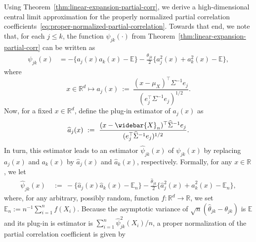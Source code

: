 \documentclass{article}
\begin{document}
 
 Using Theorem~\ref{thm:linear-expansion-partial-corr}, we derive a high-dimensional central limit approximation  for the properly normalized partial correlation coefficients~\eqref{eq:proper-normalized-partial-correlation}. Towards that end, we note that, for each $j \leq k$, the function  $\psi_{jk}(\cdot)$ from Theorem~\ref{thm:linear-expansion-partial-corr} can be written as
 \begin{equation}\label{eq:def-psi-jk}
 \begin{split}
 \psi_{jk}(x) &= -\bigg\{a_j(x)a_k(x) - \mathbb{E}\bigg\}
 
 
 - \frac{\theta_{jk}}{2}\bigg\{a_j^2(x) + a_k^2(x) - \mathbb{E}\bigg\},
 \end{split}
 \end{equation}
 where
 \begin{equation}\label{eq:ajx-function}
 x \in \mathbb{R}^d \mapsto a_j(x) ~:=~ \frac{(x - \mu_X)^{\top}\Sigma^{-1}e_j}{(e_j^{\top}\Sigma^{-1}e_j)^{1/2}}.
 \end{equation}
 Now, for a fixed $x \in \mathbb{R}^d$, define the plug-in estimator of $a_j(x)$ as
 \begin{equation}\label{eq:ajhatx-function}
 \widehat{a}_j(x) ~:=~ \frac{(x - \widebar{X}_n)^{\top}\widehat{\Sigma}^{-1}e_j}{(e_j^{\top}\widehat{\Sigma}^{-1}e_j)^{1/2}}.
 \end{equation}
 In turn, this estimator leads to an estimator $\widehat{\psi}_{jk}(x)$ of $\psi_{jk}(x)$ by replacing $a_j(x)$ and $a_k(x)$ by $\widehat{a}_j(x)$ and $\widehat{a}_k(x)$, respectively.  Formally, for any $x \in \mathbb{R}$, we let
 \begin{equation}\label{eq:def-widehat-psi-jk}
 \begin{split}
 \widehat{\psi}_{jk}(x) ~&:=~ -\bigg\{\widehat{a}_j(x)\widehat{a}_k(x) - \mathbb{E}_n\bigg\}
 
 
 - \frac{\widehat{\theta}_{jk}}{2}\bigg\{\widehat{a}_j^2(x) + \widehat{a}_k^2(x) - \mathbb{E}_n\bigg\},
 \end{split}
 \end{equation}
 where, for any arbitrary, possibly random, function $f \colon \mathbb{R}^d \rightarrow \mathbb{R}$,  we set $\mathbb{E}_n := n^{-1}\sum_{i=1}^n f(X_i)$. Because the asymptotic variance of $\sqrt{n}(\widehat{\theta}_{jk} - \theta_{jk})$ is $\mathbb{E}$ and its plug-in is estimator is $\sum_{i=1}^n \widehat{\psi}_{jk}^2(X_i)/n$, a proper normalization of the partial correlation coefficient is given by 
 \ 
 
\end{document}
